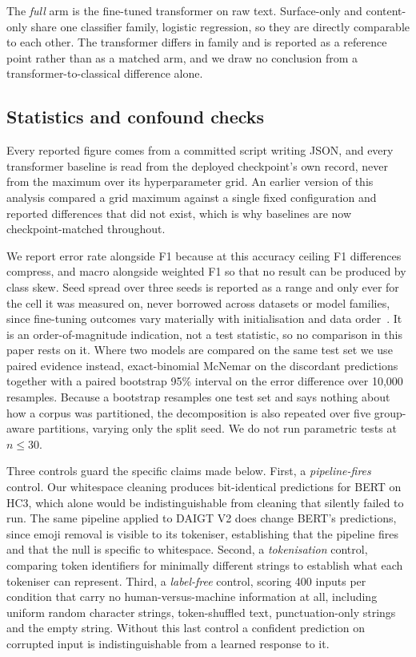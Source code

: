 The \emph{full} arm is the fine-tuned transformer on raw text. Surface-only and content-only share one classifier family, logistic regression, so they are directly comparable to each other. The transformer differs in family and is reported as a reference point rather than as a matched arm, and we draw no conclusion from a transformer-to-classical difference alone.

\subsection{Statistics and confound checks}
\label{sec:confound}

Every reported figure comes from a committed script writing JSON, and every transformer baseline is read from the deployed checkpoint's own record, never from the maximum over its hyperparameter grid. An earlier version of this analysis compared a grid maximum against a single fixed configuration and reported differences that did not exist, which is why baselines are now checkpoint-matched throughout.

We report error rate alongside F1 because at this accuracy ceiling F1 differences compress, and macro alongside weighted F1 so that no result can be produced by class skew. Seed spread over three seeds is reported as a range and only ever for the cell it was measured on, never borrowed across datasets or model families, since fine-tuning outcomes vary materially with initialisation and data order~\cite{Dodge2020fine,Mosbach2020stability}. It is an order-of-magnitude indication, not a test statistic, so no comparison in this paper rests on it. Where two models are compared on the same test set we use paired evidence instead, exact-binomial McNemar on the discordant predictions together with a paired bootstrap 95\% interval on the error difference over 10,000 resamples. Because a bootstrap resamples one test set and says nothing about how a corpus was partitioned, the decomposition is also repeated over five group-aware partitions, varying only the split seed. We do not run parametric tests at $n \le 30$.

Three controls guard the specific claims made below. First, a \emph{pipeline-fires} control. Our whitespace cleaning produces bit-identical predictions for BERT on HC3, which alone would be indistinguishable from cleaning that silently failed to run. The same pipeline applied to DAIGT V2 does change BERT's predictions, since emoji removal is visible to its tokeniser, establishing that the pipeline fires and that the null is specific to whitespace. Second, a \emph{tokenisation} control, comparing token identifiers for minimally different strings to establish what each tokeniser can represent. Third, a \emph{label-free} control, scoring 400 inputs per condition that carry no human-versus-machine information at all, including uniform random character strings, token-shuffled text, punctuation-only strings and the empty string. Without this last control a confident prediction on corrupted input is indistinguishable from a learned response to it.
